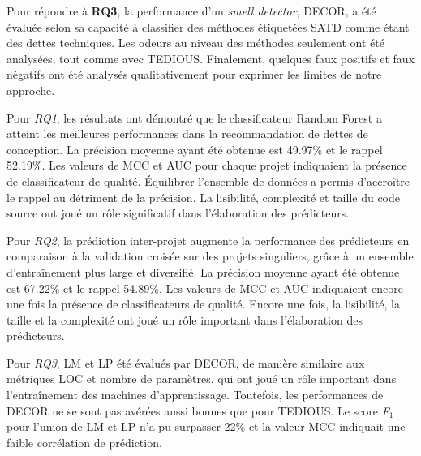 Pour r\'{e}pondre \`{a} \textbf{RQ3}, la performance d'un \emph{smell detector}, \ac{DECOR}, a \'{e}t\'{e} \'{e}valu\'{e}e selon sa capacit\'{e} \`{a} classifier des m\'{e}thodes \'{e}tiquet\'{e}es \ac{SATD} comme \'{e}tant des dettes techniques. Les odeurs au niveau des m\'{e}thodes seulement ont \'{e}t\'{e} analys\'{e}es, tout comme avec \ac{TEDIOUS}. Finalement, quelques faux positifs et faux n\'{e}gatifs ont \'{e}t\'{e} analys\'{e}s qualitativement pour exprimer les limites de notre approche. \par

Pour \emph{RQ1}, les r\'{e}sultats ont d\'{e}montr\'{e} que le classificateur Random Forest a atteint les meilleures performances dans la recommandation de dettes de conception. La pr\'{e}cision moyenne ayant \'{e}t\'{e} obtenue est 49.97\% et le rappel 52.19\%. Les valeurs de \ac{MCC} et \ac{AUC} pour chaque projet indiquaient la pr\'{e}sence de classificateur de qualit\'{e}. \'{E}quilibrer l'ensemble de donn\'{e}es a permis d'accro\^{i}tre le rappel au d\'{e}triment de la pr\'{e}cision. La lisibilit\'{e}, complexit\'{e} et taille du code source ont jou\'{e} un r\^{o}le significatif dans l'\'{e}laboration des pr\'{e}dicteurs. \par

Pour \emph{RQ2}, la pr\'{e}diction inter-projet augmente la performance des pr\'{e}dicteurs en comparaison \`{a} la validation crois\'{e}e sur des projets singuliers, gr\^{a}ce \`{a} un ensemble d'entra\^{i}nement plus large et diversifi\'{e}. La pr\'{e}cision moyenne ayant \'{e}t\'{e} obtenue est 67.22\% et le rappel 54.89\%. Les valeurs de \ac{MCC} et \ac{AUC} indiquaient encore une fois la pr\'{e}sence de classificateurs de qualit\'{e}. Encore une fois, la lisibilit\'{e}, la taille et la complexit\'{e} ont jou\'{e} un r\^{o}le important dans l'\'{e}laboration des pr\'{e}dicteurs. \par

Pour \emph{RQ3}, \ac{LM} et \ac{LP} \'{e}t\'{e} \'{e}valu\'{e}s par \ac{DECOR}, de mani\`{e}re similaire aux m\'{e}triques \ac{LOC} et nombre de param\`{e}tres, qui ont jou\'{e} un r\^{o}le important dans l'entra\^{i}nement des machines d'apprentissage. Toutefois, les performances de \ac{DECOR} ne se sont pas av\'{e}r\'{e}es aussi bonnes que pour \ac{TEDIOUS}. Le score \emph{F$_{1}$} pour l'union de \ac{LM} et \ac{LP} n'a pu surpasser 22\% et la valeur \ac{MCC} indiquait une faible corr\'{e}lation de pr\'{e}diction. \par

